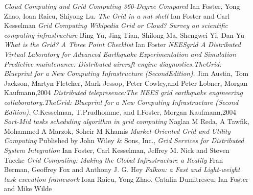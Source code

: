 \documentclass[10pt,journal,compsoc]{IEEEtran}
\begin{document}

%
%
%
\begin{thebibliography}{1}

 \emph{Cloud Computing and Grid Computing 360-Degree Compared} Ian Foster, Yong Zhao, Ioan Raicu, Shiyong Lu.
\emph{The Grid in a nut shell} Ian Foster and Carl Kesselman
\emph{Grid Computing Wikipedia}
\emph{Grid or Cloud? Survey on scientific computing infrastructure} Bing Yu, Jing Tian, Shilong Ma, Shengwei Yi, Dan Yu
\emph{What is the Grid? A Three Point Checklist} Ian Foster
\emph{NEESgrid A Distributed Virtual Laboratory for Advanced Earthquake Experimentation and Simulation}
\emph{Predictive maintenance: Distributed aircraft engine diagnostics.TheGrid: Blueprint for a New Computing Infrastructure (SecondEdition).} Jim Austin, Tom Jackson, Martyn Fletcher, Mark Jessop, Peter Cowley,and Peter Lobner, Morgan Kaufmann,2004
\emph{Distributed telepresence:The NEES grid earthquake engineering collaboratory.TheGrid: Blueprint for a New Computing Infrastructure (Second Edition). } C.Kesselman, T.Prudhomme, and I.Foster, Morgan Kaufmann,2004
\emph{Sort-Mid tasks scheduling algorithm in grid computing} Naglaa M Reda, A Tawfik, Mohammed A Marzok, Soheir M Khamis
\emph{Market-Oriented Grid and Utility Computing} Published by John Wiley \& Sons, Inc.,
\emph{Grid Services for Distributed System Integration} Ian Foster, Carl Kesselman, Jeffrey M. Nick and Steven Tuecke
\emph{Grid Computing: Making the Global Infrastructure a Reality} Fran Berman, Geoffrey Fox and Anthony J. G. Hey
\emph{Falkon: a Fast and Light-weight task execution framework}  Ioan Raicu, Yong Zhao, Catalin Dumitrescu, Ian Foster and Mike Wilde


\end{thebibliography}
\end{document}
